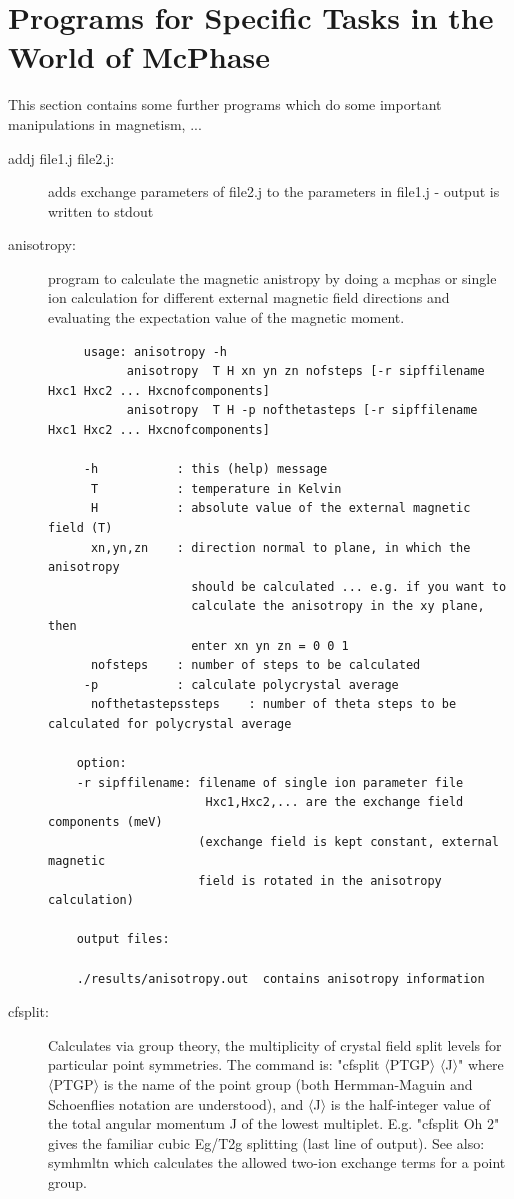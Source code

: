 \section{Programs for Specific Tasks in the World of McPhase}\label{addprog}

This section  contains some further programs which do some important manipulations
in magnetism, ...

\begin{description} 

\item [\prg addj file1.j file2.j:] adds exchange parameters of file2.j to the %
parameters in
file1.j - output is written to stdout


\item [\prg anisotropy:] program to calculate the magnetic anistropy
by doing a mcphas or
               single ion calculation for different external magnetic field
               directions and evaluating the expectation value of the magnetic 
               moment.
\begin{verbatim}
     usage: anisotropy -h
           anisotropy  T H xn yn zn nofsteps [-r sipffilename Hxc1 Hxc2 ... Hxcnofcomponents]
           anisotropy  T H -p nofthetasteps [-r sipffilename Hxc1 Hxc2 ... Hxcnofcomponents]

     -h           : this (help) message
      T           : temperature in Kelvin
      H           : absolute value of the external magnetic field (T)
      xn,yn,zn    : direction normal to plane, in which the anisotropy
                    should be calculated ... e.g. if you want to
                    calculate the anisotropy in the xy plane, then
                    enter xn yn zn = 0 0 1
      nofsteps    : number of steps to be calculated 
     -p           : calculate polycrystal average
      nofthetastepssteps    : number of theta steps to be calculated for polycrystal average

    option:
    -r sipffilename: filename of single ion parameter file
                      Hxc1,Hxc2,... are the exchange field components (meV)
                     (exchange field is kept constant, external magnetic
                     field is rotated in the anisotropy calculation)

    output files:

    ./results/anisotropy.out  contains anisotropy information

\end{verbatim}

\item [\prg cfsplit:] Calculates via group theory, the multiplicity of crystal field split levels 
for particular point symmetries. The command is: "{\prg cfsplit $\langle$PTGP$\rangle$ $\langle$J$\rangle$}"
where {\prg $\langle$PTGP$\rangle$} is the name of the point group (both Hermman-Maguin and 
Schoenflies notation are understood), and {\prg $\langle$J$\rangle$} is the half-integer value 
of the total angular momentum J of the lowest multiplet. E.g. "{\prg cfsplit Oh 2}" gives the 
familiar cubic Eg/T2g splitting (last line of output).
See also: {\prg symhmltn} which calculates the allowed two-ion exchange terms for a point group.


\end{description}
